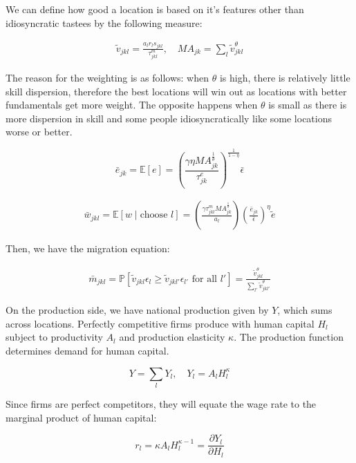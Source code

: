 \documentclass[12pt]{article}
\begin{document}
We can define how good a location is based on it's features other than idiosyncratic tastees by the following measure:

\begin{align}
    \tilde v_{jkl} = \frac{a_lr_ls_{jkl}}{\tau^m_{jkl}}, \quad MA_{jk} = \sum_l \tilde v_{jkl}^\theta
\end{align}

The reason for the weighting is as follows: when $\theta$ is high, there is relatively little skill dispersion, therefore the best locations will win out as locations with better fundamentals get more weight. The opposite happens when $\theta$ is small as there is more dispersion in skill and some people idiosyncratically like some locations worse or better.

\begin{equation}
    \bar e_{jk} = \mathbb{E}[e] = \left (\frac{\gamma\eta MA_{jk}^{\frac{1}{\theta}}}{\tau^e_{jk}} \right )^{\frac{1}{1-\eta}}\bar\epsilon
\end{equation}

\begin{align}
    \bar w_{jkl} = \mathbb{E} [w\mid \text{choose } l] = \left (\frac{\gamma \tau_{jkl}^m MA_{jk}^{\frac{1}{\theta}}}{a_l}\right ) \left (\frac{\bar e_{jk}}{\bar \epsilon} \right )^\eta \tilde e 
\end{align}

Then, we have the migration equation: 

\begin{align}
    \bar m_{jkl} = \mathbb{P}[\tilde v_{jkl}\epsilon_l\geq \tilde v_{jkl'}\epsilon_{l'} \text{ for all }l'] = \frac{\tilde v_{jkl}^\theta}{\sum_{l'}\tilde v^\theta_{jkl'} }
\end{align}


On the production side, we have national production given by $Y$, which sums across locations. Perfectly competitive firms produce with human capital $H_l$ subject to productivity $A_l$ and production elasticity $\kappa$. The production function determines demand for human capital.

\begin{equation}
    Y = \sum_l Y_l, \quad Y_l = A_lH_l^\kappa
\end{equation}

Since firms are perfect competitors, they will equate the wage rate to the marginal product of human capital:

\begin{equation}
    r_l = \kappa A_lH_l^{\kappa-1} = \frac{\partial Y_l}{\partial H_l}
\end{equation}
\end{document}
